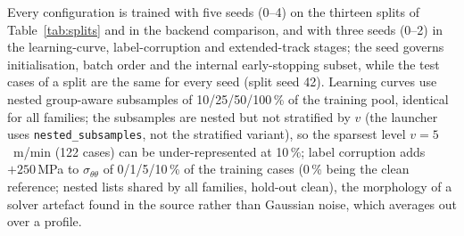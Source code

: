 Every configuration is trained with five seeds (0--4) on the thirteen splits of
Table~\ref{tab:splits} and in the backend comparison, and with three seeds (0--2)
in the learning-curve, label-corruption and extended-track stages;
the seed governs initialisation, batch order and the internal early-stopping subset, %
while the test cases of a split are the same for every seed (split seed 42).
Learning curves use nested group-aware subsamples of 10/25/50/100\,\% of the
training pool, identical for all families;
the subsamples are nested but not stratified by $v$ (the launcher uses
\texttt{nested\_subsamples}, not the stratified variant), so the sparsest level
$v = 5$~m/min (122 cases) can be under-represented at 10\,\%;
label corruption adds $+250$\,MPa to $\sigma_{\theta\theta}$ of 0/1/5/10\,\% of
the training cases (0\,\% being the clean reference; nested lists shared by all
families, hold-out clean), the morphology of a solver artefact found in the
source rather than Gaussian noise, which averages out over a profile.

